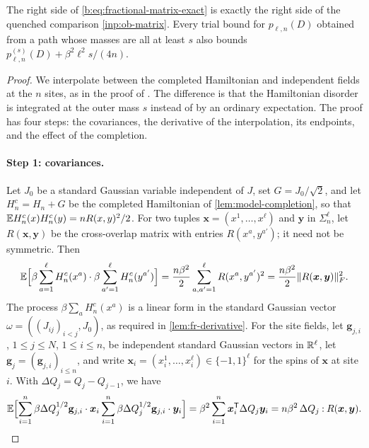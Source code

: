 The right side of \eqref{b:eq:fractional-matrix-exact} is exactly the right side of the quenched comparison \cref{inp:ob-matrix}. Every trial bound for $p_{\ell,n}(D)$ obtained from a path whose masses are all at least $s$ also bounds $p^{(s)}_{\ell,n}(D)+\beta^2\ell^2s/(4n)$.

\begin{proof}
We interpolate between the completed Hamiltonian and independent fields at the $n$ sites, as in the proof of \cite[Proposition~2.3]{oai-barriers}. The difference is that the Hamiltonian disorder is integrated at the outer mass $s$ instead of by an ordinary expectation. The proof has four steps: the covariances, the derivative of the interpolation, its endpoints, and the effect of the completion.

\paragraph{Step 1: covariances.} Let $J_0$ be a standard Gaussian variable independent of $J$, set $G=J_0/\sqrt2$, and let $H^c_n=H_n+G$ be the completed Hamiltonian of \cref{lem:model-completion}, so that $\mathbb E H^c_n(x)H^c_n(y)=nR(x,y)^2/2$. For two tuples $\bm x=(x^1,\dots,x^\ell)$ and $\bm y$ in $\Sigma_n^\ell$, let $R(\bm x,\bm y)$ be the cross-overlap matrix with entries $R(x^a,y^{a'})$; it need not be symmetric. Then
\begin{equation}\label{eq:fr-hamiltonian-covariance}
 \mathbb E\Bigl[\beta\sum_{a=1}^\ell H^c_n(x^a)\cdot\beta\sum_{a'=1}^\ell H^c_n(y^{a'})\Bigr]
 =\frac{n\beta^2}2\sum_{a,a'=1}^\ell R(x^a,y^{a'})^2=\frac{n\beta^2}2\lVert R(\bm x,\bm y)\rVert_F^2.
\end{equation}
The process $\beta\sum_aH^c_n(x^a)$ is a linear form in the standard Gaussian vector $\omega=((J_{ij})_{i<j},J_0)$, as required in \cref{lem:fr-derivative}. For the site fields, let $\mathbf g_{j,i}$, $1\le j\le N$, $1\le i\le n$, be independent standard Gaussian vectors in $\mathbb R^\ell$, let $\mathbf g_j=(\mathbf g_{j,i})_{i\le n}$, and write $\bm x_i=(x^1_i,\dots,x^\ell_i)\in\{-1,1\}^\ell$ for the spins of $\bm x$ at site $i$. With $\Delta Q_j=Q_j-Q_{j-1}$, we have
\begin{equation}\label{eq:fr-field-covariance}
 \mathbb E\Bigl[\sum_{i=1}^n\beta\Delta Q_j^{1/2}\mathbf g_{j,i}\cdot\bm x_i\sum_{i=1}^n\beta\Delta Q_j^{1/2}\mathbf g_{j,i}\cdot\bm y_i\Bigr]
 =\beta^2\sum_{i=1}^n\bm x_i^{\mathsf T}\Delta Q_j\bm y_i
 =n\beta^2\,\Delta Q_j\mathbin{:}R(\bm x,\bm y).
\end{equation}


\end{proof}
